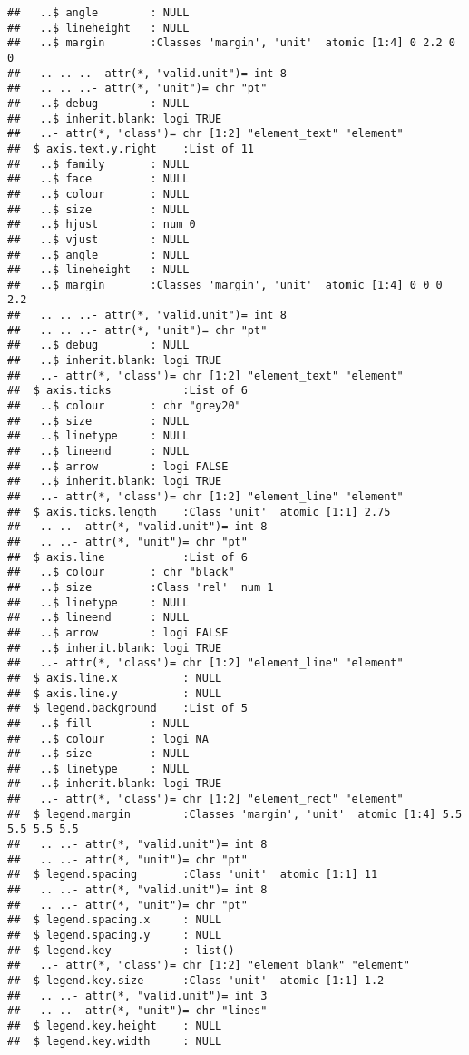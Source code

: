 \documentclass[]{article}
\begin{document}
\begin{verbatim}
##   ..$ angle        : NULL
##   ..$ lineheight   : NULL
##   ..$ margin       :Classes 'margin', 'unit'  atomic [1:4] 0 2.2 0 0
##   .. .. ..- attr(*, "valid.unit")= int 8
##   .. .. ..- attr(*, "unit")= chr "pt"
##   ..$ debug        : NULL
##   ..$ inherit.blank: logi TRUE
##   ..- attr(*, "class")= chr [1:2] "element_text" "element"
##  $ axis.text.y.right    :List of 11
##   ..$ family       : NULL
##   ..$ face         : NULL
##   ..$ colour       : NULL
##   ..$ size         : NULL
##   ..$ hjust        : num 0
##   ..$ vjust        : NULL
##   ..$ angle        : NULL
##   ..$ lineheight   : NULL
##   ..$ margin       :Classes 'margin', 'unit'  atomic [1:4] 0 0 0 2.2
##   .. .. ..- attr(*, "valid.unit")= int 8
##   .. .. ..- attr(*, "unit")= chr "pt"
##   ..$ debug        : NULL
##   ..$ inherit.blank: logi TRUE
##   ..- attr(*, "class")= chr [1:2] "element_text" "element"
##  $ axis.ticks           :List of 6
##   ..$ colour       : chr "grey20"
##   ..$ size         : NULL
##   ..$ linetype     : NULL
##   ..$ lineend      : NULL
##   ..$ arrow        : logi FALSE
##   ..$ inherit.blank: logi TRUE
##   ..- attr(*, "class")= chr [1:2] "element_line" "element"
##  $ axis.ticks.length    :Class 'unit'  atomic [1:1] 2.75
##   .. ..- attr(*, "valid.unit")= int 8
##   .. ..- attr(*, "unit")= chr "pt"
##  $ axis.line            :List of 6
##   ..$ colour       : chr "black"
##   ..$ size         :Class 'rel'  num 1
##   ..$ linetype     : NULL
##   ..$ lineend      : NULL
##   ..$ arrow        : logi FALSE
##   ..$ inherit.blank: logi TRUE
##   ..- attr(*, "class")= chr [1:2] "element_line" "element"
##  $ axis.line.x          : NULL
##  $ axis.line.y          : NULL
##  $ legend.background    :List of 5
##   ..$ fill         : NULL
##   ..$ colour       : logi NA
##   ..$ size         : NULL
##   ..$ linetype     : NULL
##   ..$ inherit.blank: logi TRUE
##   ..- attr(*, "class")= chr [1:2] "element_rect" "element"
##  $ legend.margin        :Classes 'margin', 'unit'  atomic [1:4] 5.5 5.5 5.5 5.5
##   .. ..- attr(*, "valid.unit")= int 8
##   .. ..- attr(*, "unit")= chr "pt"
##  $ legend.spacing       :Class 'unit'  atomic [1:1] 11
##   .. ..- attr(*, "valid.unit")= int 8
##   .. ..- attr(*, "unit")= chr "pt"
##  $ legend.spacing.x     : NULL
##  $ legend.spacing.y     : NULL
##  $ legend.key           : list()
##   ..- attr(*, "class")= chr [1:2] "element_blank" "element"
##  $ legend.key.size      :Class 'unit'  atomic [1:1] 1.2
##   .. ..- attr(*, "valid.unit")= int 3
##   .. ..- attr(*, "unit")= chr "lines"
##  $ legend.key.height    : NULL
##  $ legend.key.width     : NULL

\end{verbatim}
\end{document}
